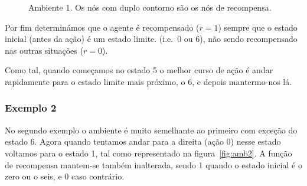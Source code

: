 \documentclass[a4paper,twocolumn]{article}
\begin{document}
    \begin{figure}[h]
        \centering
        \caption{Ambiente 1. Os nós com duplo contorno são os nós de recompensa.} \label{fig:amb1}
    \end{figure}

    Por fim determinámos que o agente é recompensado ($r = 1$) sempre que o estado
    inicial (antes da ação) é um estado limite. (i.e.~0 ou 6), não sendo recompensado
    nas outras situações ($r = 0$).

    Como tal, quando começamos no estado 5 o melhor curso de ação é andar rapidamente
    para o estado limite mais próximo, o 6, e depois mantermo-nos lá.

    \subsubsection{Exemplo 2}
    No segundo exemplo o ambiente é muito semelhante ao primeiro com exceção do estado 6. Agora quando
    tentamos andar para a direita (ação 0) nesse estado voltamos para o estado 1, tal como representado na figura~\ref{fig:amb2}.
    A função de recompensa mantem-se também inalterada, sendo 1 quando o estado inicial é o zero ou o seis, e
    0 caso contrário.
\end{document}
